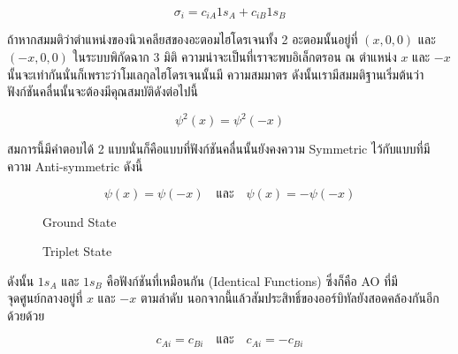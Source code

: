 \begin{equation}
    \sigma_i = c_{i A} 1 s_A+c_{i B} 1 s_B
\end{equation}

ถ้าหากสมมติว่าตำแหน่งของนิวเคลียสของอะตอมไฮโดรเจนทั้ง 2 อะตอมนั้นอยู่ที่ $\left(x, 0,0\right)$ และ $\left(-x, 0,0\right)$
ในระบบพิกัดฉาก 3 มิติ ความน่าจะเป็นที่เราจะพบอิเล็กตรอน ณ ตำแหน่ง $x$ และ $-x$ นั้นจะเท่ากันนั่นก็เพราะว่าโมเลกุลไฮโดรเจนนั้นมี%
ความสมมาตร ดังนั้นเรามีสมมติฐานเริ่มต้นว่าฟังก์ชันคลื่นนั้นจะต้องมีคุณสมบัติดังต่อไปนี้

\begin{equation}
    \psi^2(x) = \psi^2(-x)
\end{equation}

\noindent สมการนี้มีคำตอบได้ 2 แบบนั่นก็คือแบบที่ฟังก์ชันคลื่นนั้นยังคงความ Symmetric ไว้กับแบบที่มีความ Anti-symmetric ดังนี้

\begin{equation}
    \psi(x) = \psi(-x)
    \quad \text{และ} \quad
    \psi(x) = -\psi(-x)
\end{equation}

\begin{figure}[htbp]
    \label{fig:MO_H2_ground}
    \centering
    \begin{MOdiagram}[names,style=square]
    \end{MOdiagram}
    \caption{Ground State}
\end{figure}

\begin{figure}[htbp]
    \label{fig:MO_H2_triplet}
    \centering
    \begin{MOdiagram}[names,style=square]
    \end{MOdiagram}
    \caption{Triplet State}
\end{figure}

\noindent ดังนั้น $1 s_A$ และ $1 s_B$ คือฟังก์ชันที่เหมือนกัน (Identical Functions) ซึ่งก็คือ AO ที่มีจุดศูนย์กลางอยู่ที่ $x$ และ
$-x$ ตามลำดับ นอกจากนี้แล้วสัมประสิทธิ์ของออร์บิทัลยังสอดคล้องกันอีกด้วยด้วย

\begin{equation}
    c_{A i} = c_{B i}
    \quad \text{และ} \quad
    c_{A i} = -c_{B i}
\end{equation}

